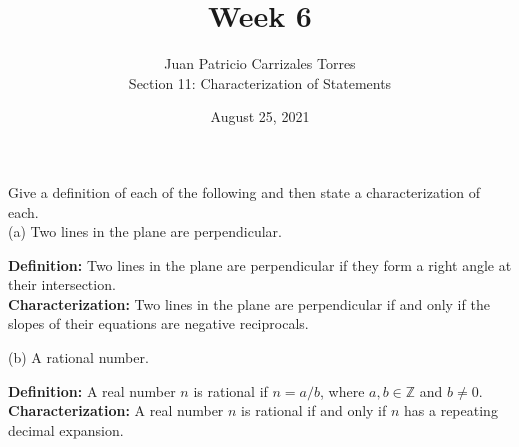 \documentclass[12pt]{article}
\newcommand{\Z}{\mathbb{Z}}
\newenvironment{problem}[2][Problem]{\begin{trivlist}
		\item[\hskip \labelsep {\bfseries #1}\hskip \labelsep {\bfseries #2.}]}{\end{trivlist}}
\newenvironment{solution}[2][Solution]{\begin{trivlist}
		\item[\hskip \labelsep {\bfseries #1}\hskip \labelsep {\bfseries #2.}]}{\end{trivlist}}
\begin{document}
	
	\title{Week 6}
	\author{Juan Patricio Carrizales Torres \\
		Section 11: Characterization of Statements}
	\date{August 25, 2021}
	\maketitle
	
	\begin{problem}{80}
		Give a definition of each of the following and then state a characterization of each.\\
		
		(a) Two lines in the plane are perpendicular.
		\begin{solution}{a}
			\textbf{Definition:} Two lines in the plane are perpendicular if they form a right angle at their intersection.\\
			\textbf{Characterization:} Two lines in the plane are perpendicular if and only if the slopes of their equations are negative reciprocals. 
		\end{solution}
	
		(b) A rational number.
		\begin{solution}{b}
			\textbf{Definition:} A real number $n$ is rational if $n=a/b$, where $a,b\in \Z$ and $b\neq 0$.\\
			\textbf{Characterization:} A real number $n$ is rational if and only if $n$ has a repeating decimal expansion.  
		\end{solution}
	\end{problem}
\end{document}
